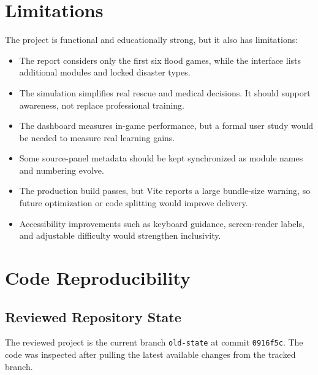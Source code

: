 \documentclass[11pt,a4paper]{article}
\newcommand{\code}[1]{\texttt{#1}}
\newcommand{\sectionline}{\vspace{0.2em}{\color{ReportBlue}\hrule height 0.8pt}\vspace{0.6em}}
\begin{document}
\section{Limitations}
\sectionline
The project is functional and educationally strong, but it also has limitations:
\begin{itemize}
  \item The report considers only the first six flood games, while the interface lists additional modules and locked disaster types.
  \item The simulation simplifies real rescue and medical decisions. It should support awareness, not replace professional training.
  \item The dashboard measures in-game performance, but a formal user study would be needed to measure real learning gains.
  \item Some source-panel metadata should be kept synchronized as module names and numbering evolve.
  \item The production build passes, but Vite reports a large bundle-size warning, so future optimization or code splitting would improve delivery.
  \item Accessibility improvements such as keyboard guidance, screen-reader labels, and adjustable difficulty would strengthen inclusivity.
\end{itemize}

\section{Code Reproducibility}
\sectionline
\subsection{Reviewed Repository State}
The reviewed project is the current branch \code{old-state} at commit \code{0916f5c}. The code was inspected after pulling the latest available changes from the tracked branch.
\end{document}

